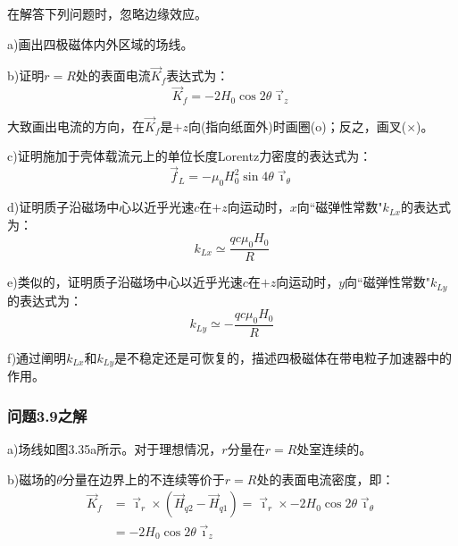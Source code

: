 在解答下列问题时，忽略边缘效应。

a)画出四极磁体内外区域的场线。 

b)证明$r=R$处的表面电流$\vec{K}_f$表达式为：
\begin{equation}
\vec{K}_{f}=-2H_{0}\cos 2\theta\vec{\imath}_{z}%
\end{equation}

大致画出电流的方向，在$\vec{K}_f$是$+z$向(指向纸面外)时画圈(o)；反之，画叉(×)。

c)证明施加于壳体载流元上的单位长度Lorentz力密度的表达式为：
\begin{equation}
\vec{f}_{L}=-\mu_{0}H_{0}^{2}\sin 4\theta\vec{\imath}_{\theta}%
\end{equation}

d)证明质子沿磁场中心以近乎光速$c$在$+z$向运动时，$x$向``磁弹性常数"$k_{Lx}$的表达式为：
\begin{equation}
k_{Lx}\simeq\frac{qc\mu_{0}H_{0}}{R}%
\end{equation}

e)类似的，证明质子沿磁场中心以近乎光速$c$在$+z$向运动时，$y$向``磁弹性常数"$k_{Ly}$的表达式为：
\begin{equation}
k_{Ly}\simeq-\frac{qc\mu_{0}H_{0}}{R}%
\end{equation}

f)通过阐明$k_{Lx}$和$k_{Ly}$是不稳定还是可恢复的，描述四极磁体在带电粒子加速器中的作用。

\subsubsection{问题3.9之解}
a)场线如图3.35a所示。对于理想情况，$r$分量在$r=R$处室连续的。

b)磁场的$\theta$分量在边界上的不连续等价于$r=R$处的表面电流密度，即：
\begin{equation*}
\begin{split}
\vec{K}_{f}&=\vec{\imath}_{r}\times(\vec{H}_{q2}-\vec{H}_{q1})=\vec{\imath}_{r}\times-2H_{0}\cos 2\theta\vec{\imath}_{\theta}\\
&=-2H_{0}\cos 2\theta\vec{\imath}_{z}%
\end{split} \tag{3.146}
\end{equation*}

